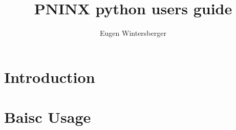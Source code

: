 \documentclass[a4paper]{book}
\title{{\Huge PNINX python users guide}}
\author{Eugen Wintersberger}
\begin{document}
\maketitle
\tableofcontents

\chapter{Introduction}


\chapter{Baisc Usage}

\end{document}
